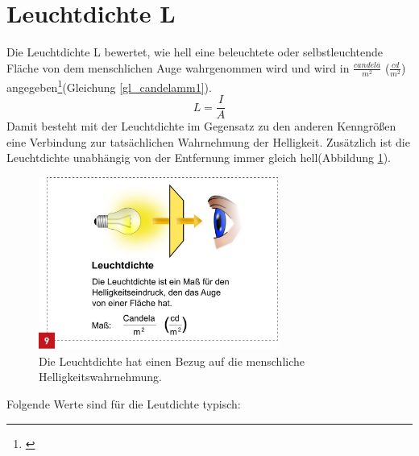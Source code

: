 \section{Leuchtdichte L}\label{sec_candelamm}
Die Leuchtdichte L bewertet, wie hell eine beleuchtete oder selbstleuchtende Fläche von dem menschlichen Auge wahrgenommen wird und wird in $\frac{candela}{m^{2}}$ ($\frac{cd}{m^{2}}$) angegeben\footnote{\cite[34]{ris}}(Gleichung \ref{gl_candelamm1}).
 \begin{equation}\label{gl_candelamm1}
	L=\frac{I}{A}	
\end{equation}
Damit besteht mit der Leuchtdichte im Gegensatz zu den anderen Kenngrößen eine Verbindung zur tatsächlichen Wahrnehmung der Helligkeit. Zusätzlich ist die Leuchtdichte unabhängig von der Entfernung immer gleich hell(Abbildung \ref{b_candelamm}).

 \begin{figure}[H]     %
\centering
\includegraphics[width=0.7\textwidth]{bilder/candelamm} 
\caption {Die Leuchtdichte hat einen Bezug auf die menschliche Helligkeitswahrnehmung.\protect\footnotemark}\label{b_candelamm}
\end{figure}

Folgende Werte sind für die Leutdichte typisch:

